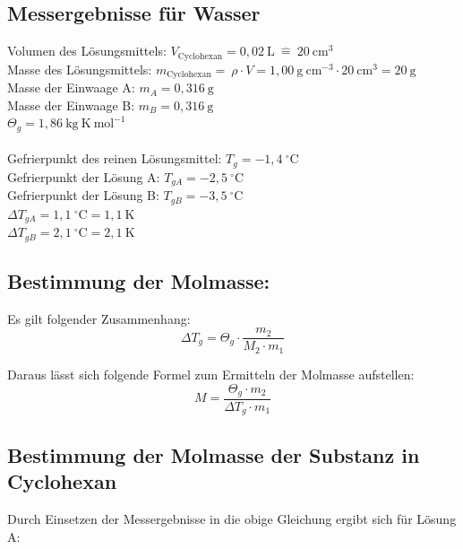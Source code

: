 \documentclass[12pt,a4paper,titlepage,headinclude,bibtotoc]{scrartcl}
\begin{document}
\subsection{Messergebnisse für Wasser}

Volumen des Lösungsmittels: $V_{\mathrm{Cyclohexan}} = 0,02 {~} \mathrm{L}{~}\widehat{=}{~}20 {~}\mathrm{cm^3}$ \\
Masse des Lösungsmittels:  $m_{\mathrm{Cyclohexan}} = {~} \rho \cdot V = 1,00{~} \mathrm{g {~}cm^{-3}} \cdot 20{~} \mathrm{cm^{3}} = 20{~}\mathrm{g}$\\
Masse der Einwaage A: $m_A = 0,316{~} \mathrm{g}$\\ 
Masse der Einwaage B: $m_B = 0,316{~} \mathrm{g}$\\
$\Theta _g = 1,86 {~}\mathrm{kg{~}K {~} mol^{-1}}$\\\\
Gefrierpunkt des reinen Lösungsmittel: $ T_g = -1,4 {~}^{\circ}\text{C}$\\
Gefrierpunkt der Lösung A: $ T_{gA} = -2,5 {~}^{\circ}\text{C}$\\
Gefrierpunkt der Lösung B: $ T_{gB} = -3,5 {~}^{\circ}\text{C}$\\
$ \Delta T _{gA} =  1,1 {~}^{\circ}\text{C} = 1,1 {~}\mathrm{K} $\\
$ \Delta T _{gB} = 2,1 {~}^{\circ}\text{C} = 2,1{~} \mathrm{K} $

\subsection{Bestimmung der Molmasse:}

Es gilt folgender Zusammenhang:
\begin{equation}
\Delta T_g = \Theta _g \cdot \frac{m_2}{M_2 \cdot m_1}
\end{equation}

Daraus lässt sich folgende Formel zum Ermitteln der Molmasse aufstellen:
\begin{equation}
 M = \frac{\Theta _g \cdot m_2 }{ \Delta T_g\cdot m_1}
\end{equation}

\subsection{ Bestimmung der Molmasse der Substanz in Cyclohexan}

Durch Einsetzen der Messergebnisse in die obige Gleichung ergibt sich für Lösung A:\\
\end{document}
